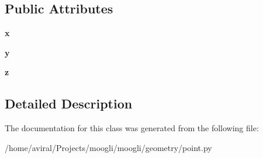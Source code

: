\subsection*{Public Attributes}
\begin{DoxyCompactItemize}
\item 
\hypertarget{classpoint_1_1Point_a8ad40c4544ff2978d58c89abdb34d607}{{\bfseries x}}\label{classpoint_1_1Point_a8ad40c4544ff2978d58c89abdb34d607}

\item 
\hypertarget{classpoint_1_1Point_a353d1b0ca4635fd6d6e85ad9a7633710}{{\bfseries y}}\label{classpoint_1_1Point_a353d1b0ca4635fd6d6e85ad9a7633710}

\item 
\hypertarget{classpoint_1_1Point_a7c0bcd0bef9336ea208f3fa06746a8b7}{{\bfseries z}}\label{classpoint_1_1Point_a7c0bcd0bef9336ea208f3fa06746a8b7}

\end{DoxyCompactItemize}


\subsection{Detailed Description}


The documentation for this class was generated from the following file\-:\begin{DoxyCompactItemize}
\item 
/home/aviral/\-Projects/moogli/moogli/geometry/point.\-py\end{DoxyCompactItemize}
